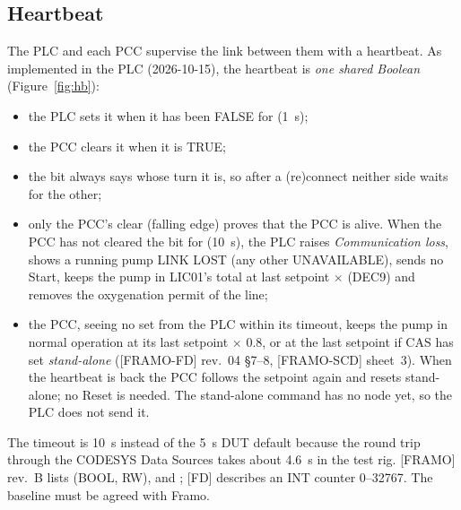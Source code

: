 \documentclass[11pt,a4paper]{article}
\begin{document}
\subsection{Heartbeat}
\label{sec:hb}
The PLC and each PCC supervise the link between them with a heartbeat. As implemented in the PLC
(2026-10-15), the heartbeat is \emph{one shared Boolean} 
(Figure~\ref{fig:hb}):
\begin{itemize}[nosep]
  \item the PLC sets it when it has been FALSE for  (1~s);
  \item the PCC clears it when it is TRUE;
  \item the bit always says whose turn it is, so after a (re)connect neither side waits for the other;
  \item only the PCC's clear (falling edge) proves that the PCC is alive. When the PCC has not cleared
        the bit for  (10~s), the PLC raises \emph{Communication loss}, shows a
        running pump LINK LOST (any other UNAVAILABLE), sends no Start, keeps the pump in LIC01's total at
        last setpoint $\times$  (DEC9) and removes the oxygenation permit of the line;
  \item the PCC, seeing no set from the PLC within its timeout, keeps the pump in normal operation at
        its last setpoint $\times$ 0.8, or at the last setpoint if CAS has set \emph{stand-alone}
        ([FRAMO-FD] rev.~04 \S7--8, [FRAMO-SCD] sheet~3). When the heartbeat is back the PCC follows the
        setpoint again and resets stand-alone; no Reset is needed. The stand-alone command has no node
        yet, so the PLC does not send it.
\end{itemize}
The timeout is 10~s instead of the 5~s DUT default because the round trip through the CODESYS Data
Sources takes about 4.6~s in the test rig. [FRAMO] rev.~B lists  (BOOL, RW),
 and ; [FD] describes an INT counter 0--32767. The
baseline must be agreed with Framo.
\end{document}
